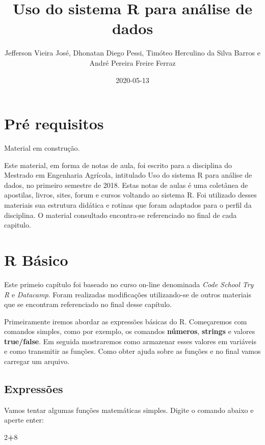 \documentclass[
]{book}
\title{Uso do sistema R para análise de dados}
\author{Jefferson Vieira José, Dhonatan Diego Pessi, Timóteo Herculino da Silva Barros e André Pereira Freire Ferraz}
\date{2020-05-13}
\newenvironment{Shaded}{\begin{snugshade}}{\end{snugshade}}
\newcommand{\DecValTok}[1]{\textcolor[rgb]{0.00,0.00,0.81}{#1}}
\newcommand{\OperatorTok}[1]{\textcolor[rgb]{0.81,0.36,0.00}{\textbf{#1}}}
\begin{document}
\maketitle

{
\setcounter{tocdepth}{1}
\tableofcontents
}
\hypertarget{pruxe9-requisitos}{%
\chapter{Pré requisitos}\label{pruxe9-requisitos}}

Material em construção.

Este material, em forma de notas de aula, foi escrito para a disciplina do Mestrado em Engenharia Agrícola, intitulado Uso do sistema R para análise de dados, no primeiro semestre de 2018.
Estas notas de aulas é uma coletânea de apostilas, livros, sites, forum e cursos voltando ao sistema R. Foi utilizado desses materiais sua estrutura didática e rotinas que foram adaptados para o perfil da disciplina.
O material consultado encontra-se referenciado no final de cada capitulo.

\hypertarget{r-buxe1sico}{%
\chapter{R Básico}\label{r-buxe1sico}}

Este primeio capítulo foi baseado no curso on-line denominada \emph{Code School Try R} e \emph{Datacamp}. Foram realizadas modificações utilizando-se de outros materiais que se encontram referenciado no final desse capítulo.

Primeiramente iremos abordar as expressões básicas do R.
Começaremos com comandos simples, como por exemplo, os comandos \textbf{números}, \textbf{strings} e valores \textbf{true/false}. Em seguida mostraremos como armazenar esses valores em variáveis e como transmitir as funções. Como obter ajuda sobre as funções e no final vamos carregar um arquivo.

\hypertarget{expressuxf5es}{%
\section{Expressões}\label{expressuxf5es}}

Vamos tentar algumas funções matemáticas simples. Digite o comando abaixo e aperte enter:

\begin{Shaded}
\begin{Highlighting}[]
\DecValTok{2}\OperatorTok{+}\DecValTok{8}
\end{Highlighting}
\end{Shaded}
\end{document}

